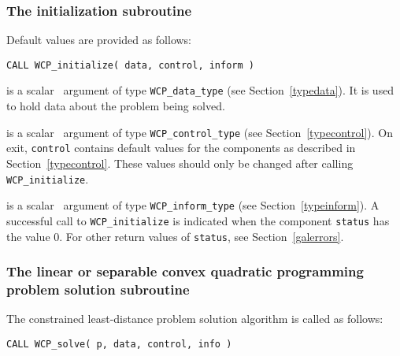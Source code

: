 \documentclass{galahad}
\newcommand{\packagename}{WCP}
\begin{document}

\subsubsection{The initialization subroutine}\label{subinit}
 Default values are provided as follows:
\vspace*{1mm}

\hspace{8mm}
{\tt CALL \packagename\_initialize( data, control, inform )}

\vspace*{-3mm}
\begin{description}

 is a scalar \intentinout\ argument of type 
{\tt \packagename\_data\_type}
(see Section~\ref{typedata}). It is used to hold data about the problem being 
solved. 

 is a scalar \intentout\ argument of type 
{\tt \packagename\_control\_type}
(see Section~\ref{typecontrol}). 
On exit, {\tt control} contains default values for the components as
described in Section~\ref{typecontrol}.
These values should only be changed after calling 
{\tt \packagename\_initialize}.

 is a scalar \intentinout\ argument of type 
{\tt \packagename\_inform\_type}
(see Section~\ref{typeinform}). A successful call to
{\tt \packagename\_initialize}
is indicated when the  component {\tt status} has the value 0. 
For other return values of {\tt status}, see Section~\ref{galerrors}.

\end{description}


\subsubsection{The linear or separable convex quadratic programming problem 
solution subroutine}
The  constrained least-distance problem solution algorithm is called as follows:
\vspace*{1mm}

\hspace{8mm}
{\tt CALL \packagename\_solve( p, data, control, info )}
\end{document}
